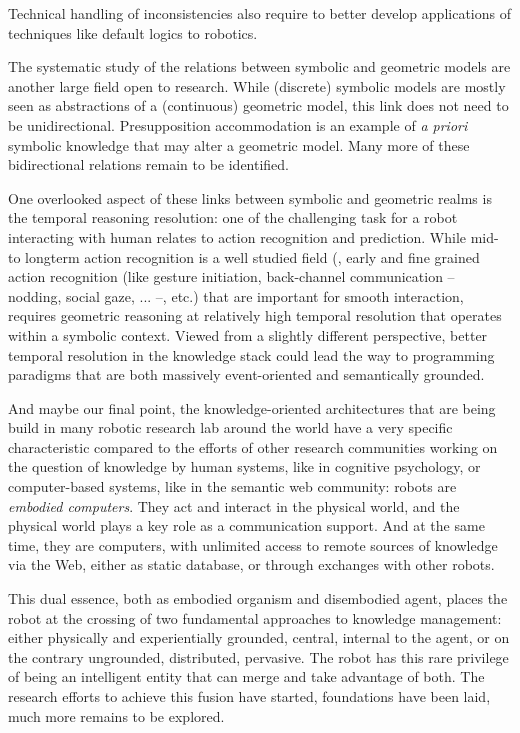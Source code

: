 Technical handling of inconsistencies also require to better develop
applications of techniques like default logics to robotics.

\par

The systematic study of the relations between symbolic and geometric models are
another large field open to research. While (discrete) symbolic models are
mostly seen as abstractions of a (continuous) geometric model, this link does
not need to be unidirectional. Presupposition accommodation is an example of
{\it a priori} symbolic knowledge that may alter a geometric model. Many more
of these bidirectional relations remain to be identified.

One overlooked aspect of these links between symbolic and geometric realms is
the temporal reasoning resolution: one of the challenging task for a robot
interacting with human relates to action recognition and prediction. While mid-
to longterm action recognition is a well studied field (\cite{Ghallab1996,
Johnson2005, Tenorth2011}, early and fine grained action recognition (like
gesture initiation, back-channel communication -- nodding, social gaze, ... --,
etc.) that are important for smooth interaction, requires geometric reasoning
at relatively high temporal resolution that operates within a symbolic context.
Viewed from a slightly different perspective, better temporal resolution in the
knowledge stack could lead the way to programming paradigms that are both
massively event-oriented and semantically grounded.

\par

And maybe our final point, the knowledge-oriented architectures that are being
build in many robotic research lab around the world have a very specific
characteristic compared to the efforts of other research communities working on
the question of knowledge by human systems, like in cognitive psychology, or
computer-based systems, like in the semantic web community: robots are
\emph{embodied computers}. They act and interact in the physical world, and the
physical world plays a key role as a communication support. And at the same
time, they are computers, with unlimited access to remote sources of knowledge
via the Web, either as static database, or through exchanges with other robots.

This dual essence, both as embodied organism and disembodied agent, places the
robot at the crossing of two fundamental approaches to knowledge management:
either physically and experientially grounded, central, internal to the agent,
or on the contrary ungrounded, distributed, pervasive. The robot has this rare
privilege of being an intelligent entity that can merge and take advantage of
both. The research efforts to achieve this fusion have started, foundations have
been laid, much more remains to be explored.




